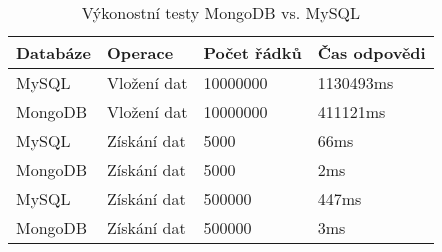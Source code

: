 \begin{table}[h]
\centering
	\caption{Výkonostní testy MongoDB vs. MySQL \cite{nosqlBenchmark}}
    \begin{tabular}{ | l | l | l | p{5cm} |}
    \hline
    Databáze & Operace & Počet řádků & Čas odpovědi \\ \hline
    MySQL & Vložení dat & 10000000 & 1130493ms \\ \hline
    MongoDB & Vložení dat & 10000000 & 411121ms \\ \hline
    MySQL & Získání dat & 5000 & 66ms \\ \hline
    MongoDB & Získání dat & 5000 & 2ms \\ \hline
    MySQL & Získání dat & 500000 & 447ms \\ \hline
    MongoDB & Získání dat & 500000 & 3ms \\ \hline
    \end{tabular}
    \label{tab:mongoVsMySQLTests}
\end{table}

